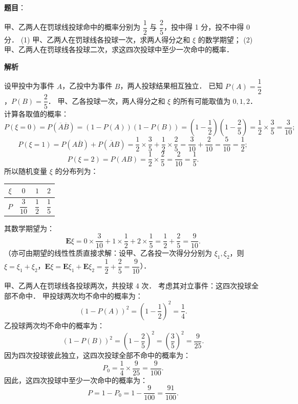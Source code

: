 \begin{answer}

\textbf{题目}：

甲、乙两人在罚球线投球命中的概率分别为 $\dfrac{1}{2}$ 与 $\dfrac{2}{5}$，投中得 1 分，投不中得 0 分．
(1) 甲、乙两人在罚球线各投球一次，求两人得分之和 $\xi$ 的数学期望；
(2) 甲、乙两人在罚球线各投球二次，求这四次投球中至少一次命中的概率．

\textbf{解析}


设甲投中为事件 $A$，乙投中为事件 $B$，两人投球结果相互独立．
已知 $P(A) = \dfrac{1}{2}$，$P(B) = \dfrac{2}{5}$．
甲、乙各投球一次，两人得分之和 $\xi$ 的所有可能取值为 $0, 1, 2$．
计算各取值的概率：
\nopagebreak[4]
\[
P(\xi = 0) = P(\overline{A}\overline{B}) = (1 - P(A))(1 - P(B)) = \left(1 - \frac{1}{2}\right)\left(1 - \frac{2}{5}\right) = \frac{1}{2} \times \frac{3}{5} = \frac{3}{10};
\]
\nopagebreak[4]
\[
P(\xi = 1) = P(A\overline{B}) + P(\overline{A}B) = \frac{1}{2} \times \frac{3}{5} + \frac{1}{2} \times \frac{2}{5} = \frac{3}{10} + \frac{2}{10} = \frac{5}{10} = \frac{1}{2};
\]
\nopagebreak[4]
\[
P(\xi = 2) = P(AB) = \frac{1}{2} \times \frac{2}{5} = \frac{2}{10} = \frac{1}{5}.
\]
所以随机变量 $\xi$ 的分布列为：

\begin{center}
\begin{tabular}{cccc}
\toprule
$\xi$ & $0$ & $1$ & $2$ \\
\midrule
$P$ & $\dfrac{3}{10}$ & $\dfrac{1}{2}$ & $\dfrac{1}{5}$ \\
\bottomrule
\end{tabular}
\end{center}

其数学期望为：
\nopagebreak[4]
\[
\mathbf{E}\xi = 0 \times \frac{3}{10} + 1 \times \frac{1}{2} + 2 \times \frac{1}{5} = \frac{1}{2} + \frac{2}{5} = \frac{9}{10}.
\]
（亦可由期望的线性性质直接求解：设甲、乙各投一次得分分别为 $\xi_1, \xi_2$，则 $\xi = \xi_1 + \xi_2$，$\mathbf{E}\xi = \mathbf{E}\xi_1 + \mathbf{E}\xi_2 = \dfrac{1}{2} + \dfrac{2}{5} = \dfrac{9}{10}$）．


甲、乙两人在罚球线各投球两次，共投球 4 次．
考虑其对立事件：这四次投球全部不命中．
甲投球两次均不命中的概率为：
\nopagebreak[4]
\[
(1 - P(A))^2 = \left(1 - \frac{1}{2}\right)^2 = \frac{1}{4}.
\]
乙投球两次均不命中的概率为：
\nopagebreak[4]
\[
(1 - P(B))^2 = \left(1 - \frac{2}{5}\right)^2 = \left(\frac{3}{5}\right)^2 = \frac{9}{25}.
\]
因为四次投球彼此独立，这四次投球全部不命中的概率为：
\nopagebreak[4]
\[
P_0 = \frac{1}{4} \times \frac{9}{25} = \frac{9}{100}.
\]
因此，这四次投球中至少一次命中的概率为：
\nopagebreak[4]
\[
P = 1 - P_0 = 1 - \frac{9}{100} = \frac{91}{100}.
\]



\end{answer}
